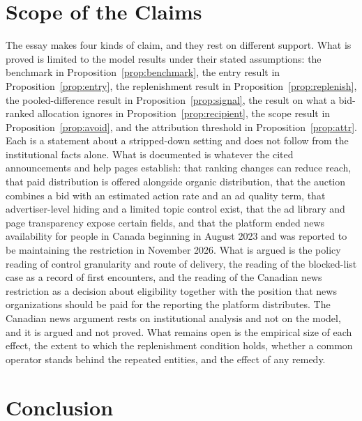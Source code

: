 \documentclass[11pt]{article}
\theoremstyle{definition}
\begin{document}
\section{Scope of the Claims}

The essay makes four kinds of claim, and they rest on different support. What is proved is limited to the model results under their stated assumptions: the benchmark in Proposition~\ref{prop:benchmark}, the entry result in Proposition~\ref{prop:entry}, the replenishment result in Proposition~\ref{prop:replenish}, the pooled-difference result in Proposition~\ref{prop:signal}, the result on what a bid-ranked allocation ignores in Proposition~\ref{prop:recipient}, the scope result in Proposition~\ref{prop:avoid}, and the attribution threshold in Proposition~\ref{prop:attr}. Each is a statement about a stripped-down setting and does not follow from the institutional facts alone. What is documented is whatever the cited announcements and help pages establish: that ranking changes can reduce reach, that paid distribution is offered alongside organic distribution, that the auction combines a bid with an estimated action rate and an ad quality term, that advertiser-level hiding and a limited topic control exist, that the ad library and page transparency expose certain fields, and that the platform ended news availability for people in Canada beginning in August 2023 and was reported to be maintaining the restriction in November 2026. What is argued is the policy reading of control granularity and route of delivery, the reading of the blocked-list case as a record of first encounters, and the reading of the Canadian news restriction as a decision about eligibility together with the position that news organizations should be paid for the reporting the platform distributes. The Canadian news argument rests on institutional analysis and not on the model, and it is argued and not proved. What remains open is the empirical size of each effect, the extent to which the replenishment condition holds, whether a common operator stands behind the repeated entities, and the effect of any remedy.

\section{Conclusion}
\end{document}
